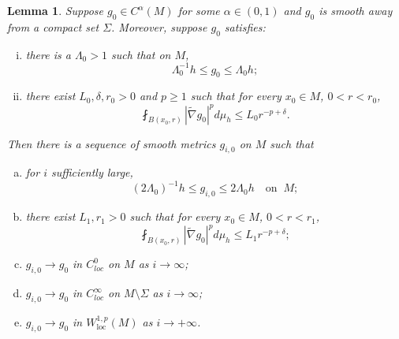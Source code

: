 \documentclass[12pt]{amsart}
\newcommand{\hdel}{\tilde{\nabla}}
\newtheorem{lma}[thm]{Lemma}
\theoremstyle{remark}
\numberwithin{equation}{section}
\begin{document}
\begin{lma}\label{lem:mollification-scheme}
    Suppose $g_0 \in C^\alpha(M)$ for some $\alpha \in (0,1)$ and $g_0$ is smooth away from a compact set $\Sigma$. Moreover, suppose $g_0$ satisfies:
    \begin{enumerate}[(i)]
        \item there is a $\Lambda_0 > 1$ such that on $M$,
        \begin{equation*}
            \Lambda_0^{-1}h \leq g_0 \leq \Lambda_0 h;
        \end{equation*}
        \item   there exist $L_0,\delta,r_0 > 0$ and $p\geq 1$ such that for every $x_0 \in M$, $0 < r < r_0$,
        \begin{equation*}
            \fint_{B(x_0,r)} |\hdel g_0|^p d\mu_h \leq L_0 r^{-p+\delta}.
        \end{equation*}
    \end{enumerate}
    Then there is a sequence of smooth metrics $g_{i,0}$ on $M$ such that %
    \begin{enumerate}[(a)]
        \item for $i$ sufficiently large,
        \begin{equation*}
            (2\Lambda_0)^{-1}h \leq g_{i,0} \leq 2\Lambda_0 h\quad\text{on}\;\;M;
        \end{equation*}
        \item  there exist $L_1,r_1 > 0$  such that for every $x_0 \in M$, $0 < r < r_1$,
        \begin{equation*}
            \fint_{B(x_0,r)} |\hdel g_0|^p d\mu_h \leq L_1 r^{-p+\delta};
        \end{equation*}
        \item $g_{i,0} \to g_0$ in $C^0_{loc}$ on $M$ as $i \to \infty$;
        \item $g_{i,0} \to g_0$ in $C^\infty_{loc}$ on $M\setminus\Sigma$ as $i \to \infty$;
        \item $g_{i,0} \to g_0$ in $W^{1,p}_\text{loc}(M)$ as $i\to+\infty$.
    \end{enumerate}
\end{lma}
\end{document}
